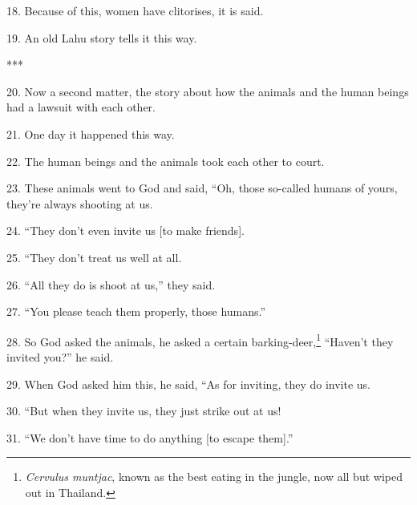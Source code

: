 18. Because of this, women have clitorises, it is said.

19. An old Lahu story tells it this way.

***

20. Now a second matter, the story about how the animals and the human beings had
a lawsuit with each other.

21. One day it happened this way.

22. The human beings and the animals took each other to court.

23. These animals went to God and said, ``Oh, those so-called humans of yours,
they're always shooting at us.

24. ``They don't even invite us [to make friends].

25. ``They don't treat us well at all.

26. ``All they do is shoot at us,'' they said.

27. ``You please teach them properly, those humans.''

28. So God asked the animals, he asked a certain barking-deer,\footnote{\textit{Cervulus muntjac}, known as the best eating in the jungle, now all but wiped out in Thailand.} ``Haven't they
invited you?'' he said.

29. When God asked him this, he said, ``As for inviting, they do invite us.

30. ``But when they invite us, they just strike out at us!

31. ``We don't have time to do anything [to escape them].''

